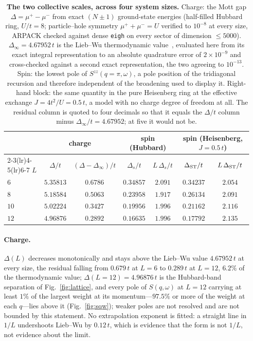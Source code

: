 \begin{table}[tp]\centering\small
\caption{\textbf{The two collective scales, across four system sizes.} Charge: the Mott gap
$\Delta=\mu^{+}-\mu^{-}$ from exact $(N{\pm}1)$ ground-state energies (half-filled Hubbard ring,
$U/t=8$; particle--hole symmetry $\mu^{+}+\mu^{-}=U$ verified to $10^{-8}$ at every size, ARPACK
checked against dense \texttt{eigh} on every sector of dimension $\le5000$). $\Delta_\infty=4.67952\,t$
is the Lieb--Wu thermodynamic value~\cite{liebwu1968}, evaluated here from its exact integral
representation to an absolute quadrature error of $2\times10^{-9}$ and cross-checked against a second
exact representation, the two agreeing to $10^{-13}$. Spin: the lowest pole of
$S^{zz}(q=\pi,\omega)$, a pole position of the tridiagonal recursion and therefore independent of the
broadening used to display it. Right-hand block: the same quantity in the pure Heisenberg ring at the
effective exchange $J=4t^{2}/U=0.5\,t$, a model with no charge degree of freedom at all. The residual
column is quoted to four decimals so that it equals the $\Delta/t$ column minus $\Delta_\infty/t=4.67952$;
at five it would not be.}\label{tab:gaps}
\begin{tabular}{lcccccc}
\toprule
 & \multicolumn{2}{c}{charge} & \multicolumn{2}{c}{spin (Hubbard)} & \multicolumn{2}{c}{spin (Heisenberg, $J=0.5\,t$)}\\
\cmidrule(lr){2-3}\cmidrule(lr){4-5}\cmidrule(lr){6-7}
$L$ & $\Delta/t$ & $(\Delta-\Delta_\infty)/t$ & $\Delta_{s}/t$ & $L\,\Delta_{s}/t$ & $\Delta_{\rm ST}/t$ & $L\,\Delta_{\rm ST}/t$\\
\midrule
$6$  & $5.35813$ & $0.6786$ & $0.34857$ & $2.091$ & $0.34237$ & $2.054$\\
$8$  & $5.18584$ & $0.5063$ & $0.23958$ & $1.917$ & $0.26134$ & $2.091$\\
$10$ & $5.02224$ & $0.3427$ & $0.19956$ & $1.996$ & $0.21162$ & $2.116$\\
$12$ & $4.96876$ & $0.2892$ & $0.16635$ & $1.996$ & $0.17792$ & $2.135$\\
\bottomrule
\end{tabular}
\end{table}

\paragraph{Charge.} $\Delta(L)$ decreases monotonically and stays above the Lieb--Wu value
$4.67952\,t$ at every size, the residual falling from $0.679\,t$ at $L=6$ to $0.289\,t$ at $L=12$,
$6.2\%$ of the thermodynamic value; $\Delta(L=12)=4.96876\,t$ is the Hubbard-band separation of
Fig.~\ref{fig:lattice}, and every pole of $S(q,\omega)$ at $L=12$ carrying at least $1\%$ of the
largest weight at its momentum---$97.5\%$ or more of the weight at each $q$---lies above it
(Fig.~\ref{fig:sqw}); weaker poles are not resolved and are not bounded by this statement. No extrapolation exponent is fitted: a straight line in $1/L$ undershoots
Lieb--Wu by $0.12\,t$, which is evidence that the form is not $1/L$, not evidence about the limit.

